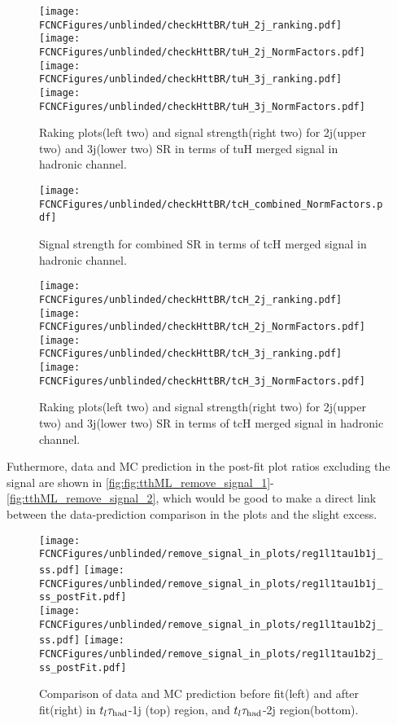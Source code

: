 \begin{figure}[H]
\centering
\texttt{[image: \\FCNCFigures/unblinded/checkHttBR/tuH\_2j\_ranking.pdf]}
\texttt{[image: \\FCNCFigures/unblinded/checkHttBR/tuH\_2j\_NormFactors.pdf]}
\\
\texttt{[image: \\FCNCFigures/unblinded/checkHttBR/tuH\_3j\_ranking.pdf]}
\texttt{[image: \\FCNCFigures/unblinded/checkHttBR/tuH\_3j\_NormFactors.pdf]}
\caption{Raking plots(left two) and signal strength(right two) for 2j(upper two) and 3j(lower two) SR in terms of tuH merged signal in hadronic channel.}
\label{fig:xTFW_tuH_23j_NF}
\end{figure}


\begin{figure}[H]
\centering
\texttt{[image: \\FCNCFigures/unblinded/checkHttBR/tcH\_combined\_NormFactors.pdf]}
\\
\caption{Signal strength for combined SR in terms of tcH merged signal in hadronic channel.}
\label{fig:xTFW_tcH_NF}
\end{figure}

\begin{figure}[H]
\centering
\texttt{[image: \\FCNCFigures/unblinded/checkHttBR/tcH\_2j\_ranking.pdf]}
\texttt{[image: \\FCNCFigures/unblinded/checkHttBR/tcH\_2j\_NormFactors.pdf]}
\\
\texttt{[image: \\FCNCFigures/unblinded/checkHttBR/tcH\_3j\_ranking.pdf]}
\texttt{[image: \\FCNCFigures/unblinded/checkHttBR/tcH\_3j\_NormFactors.pdf]}
\caption{Raking plots(left two) and signal strength(right two) for 2j(upper two) and 3j(lower two) SR in terms of tcH merged signal in hadronic channel.}
\label{fig:xTFW_tcH_23j_NF}
\end{figure}


Futhermore, data and MC prediction in the post-fit plot ratios excluding the signal are shown in \ref{fig:fig:tthML_remove_signal_1}-\ref{fig:tthML_remove_signal_2}, which would be good to make a direct link between the data-prediction comparison in the plots and the slight excess. 

\begin{figure}[H]
\centering
\texttt{[image: \\FCNCFigures/unblinded/remove\_signal\_in\_plots/reg1l1tau1b1j\_ss.pdf]}
\texttt{[image: \\FCNCFigures/unblinded/remove\_signal\_in\_plots/reg1l1tau1b1j\_ss\_postFit.pdf]}
\\
\texttt{[image: \\FCNCFigures/unblinded/remove\_signal\_in\_plots/reg1l1tau1b2j\_ss.pdf]}
\texttt{[image: \\FCNCFigures/unblinded/remove\_signal\_in\_plots/reg1l1tau1b2j\_ss\_postFit.pdf]}
\caption{Comparison of data and MC prediction before fit(left) and after fit(right) in $t_l\tau_\text{had}$-1j (top) region, and $t_l\tau_\text{had}$-2j region(bottom).}
\label{fig:tthML_remove_signal_1}
\end{figure}

